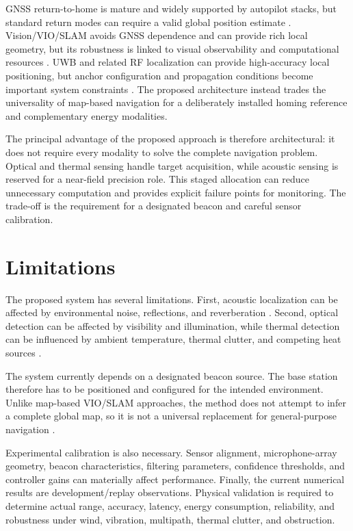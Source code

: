 \documentclass[conference]{IEEEtran}
\begin{document}
GNSS return-to-home is mature and widely supported by autopilot stacks, but
standard return modes can require a valid global position estimate
\cite{px4guide,px4return}. Vision/VIO/SLAM avoids GNSS dependence and can provide
rich local geometry, but its robustness is linked to visual observability and
computational resources
\cite{leutenegger2015,forster2017,orbslam3}. UWB and related RF localization
can provide high-accuracy local positioning, but anchor configuration and
propagation conditions become important system constraints
\cite{zafari2019,wang2024}. The proposed architecture instead trades the
universality of map-based navigation for a deliberately installed homing
reference and complementary energy modalities.

The principal advantage of the proposed approach is therefore architectural:
it does not require every modality to solve the complete navigation problem.
Optical and thermal sensing handle target acquisition, while acoustic sensing
is reserved for a near-field precision role. This staged allocation can reduce
unnecessary computation and provides explicit failure points for monitoring.
The trade-off is the requirement for a designated beacon and careful sensor
calibration.


\section{Limitations}

The proposed system has several limitations. First, acoustic localization can
be affected by environmental noise, reflections, and reverberation
\cite{brandstein2001,chen2006}. Second, optical detection can be affected by
visibility and illumination, while thermal detection can be influenced by
ambient temperature, thermal clutter, and competing heat sources
\cite{jensen2007,thermal2026}.

The system currently depends on a designated beacon source. The base station
therefore has to be positioned and configured for the intended environment.
Unlike map-based VIO/SLAM approaches, the method does not attempt to infer a
complete global map, so it is not a universal replacement for general-purpose
navigation
\cite{orbslam3,thrun2005}.

Experimental calibration is also necessary. Sensor alignment, microphone-array
geometry, beacon characteristics, filtering parameters, confidence thresholds,
and controller gains can materially affect performance. Finally, the current
numerical results are development/replay observations. Physical validation is
required to determine actual range, accuracy, latency, energy consumption,
reliability, and robustness under wind, vibration, multipath, thermal clutter,
and obstruction.
\end{document}
